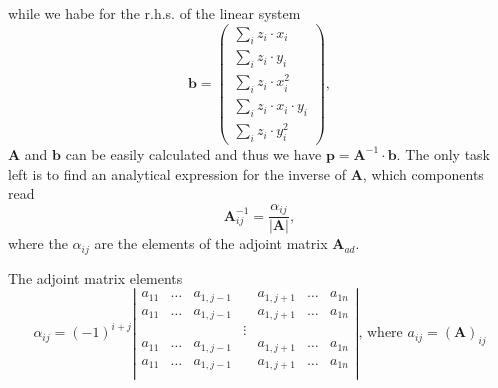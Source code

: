 while we habe for the r.h.s. of the linear system
\[ 
\mathbf{b}=
\begin{pmatrix}
\sum_iz_i\cdot x_i\\
\sum_iz_i\cdot y_i\\
\sum_iz_i\cdot x_i^2\\
\sum_iz_i\cdot x_i\cdot y_i\\
\sum_iz_i\cdot y_i^2
\end{pmatrix},
\]
$\mathbf{A}$ and $\mathbf{b}$ can be easily calculated and thus we have $\mathbf{p}=\mathbf{A}^{-1}\cdot\mathbf{b}$. The only task left is to find an analytical expression for the inverse of $\mathbf{A}$, which components read
\[
\mathbf{A}^{-1}_{ij}=\frac{\alpha_{ij}}{|\mathbf{A}|},
\]
where the $\alpha_{ij}$ are the elements of the adjoint matrix $\mathbf{A}_{ad}$. 
\begin{note}{The adjoint matrix elements}
\[
\alpha_{ij}=(-1)^{i+j}
\left|
\begin{matrix}
a_{11}&\dots &a_{1,j-1}& &a_{1,j+1}&\dots &a_{1n}\\
a_{11}&\dots &a_{1,j-1}& &a_{1,j+1}&\dots &a_{1n}\\
&&&\vdots &&&\\
a_{11}&\dots &a_{1,j-1}& &a_{1,j+1}&\dots &a_{1n}\\
a_{11}&\dots &a_{1,j-1}& &a_{1,j+1}&\dots &a_{1n}\\
\end{matrix}
\right|\text{, where }a_{ij}=(\mathbf{A})_{ij}
\]
\end{note}
